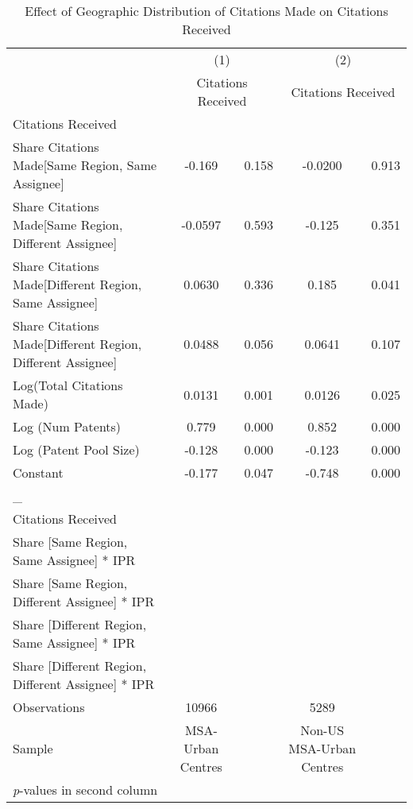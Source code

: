 {
\begin{longtable}{l*{2}{cc}}
\caption{Effect of Geographic Distribution of Citations Made on Citations Received \label{model12}}\\
\hline\hline\endfirsthead\hline\endhead\hline\endfoot\endlastfoot
                &\multicolumn{2}{c}{(1)}&\multicolumn{2}{c}{(2)}\\
                &\multicolumn{2}{c}{Citations Received}&\multicolumn{2}{c}{Citations Received}\\
\hline
Citations Received&         &         &         &         \\
Share Citations Made[Same Region, Same Assignee]&   -0.169&    0.158&  -0.0200&    0.913\\
Share Citations Made[Same Region, Different Assignee]&  -0.0597&    0.593&   -0.125&    0.351\\
Share Citations Made[Different Region, Same Assignee]&   0.0630&    0.336&    0.185&    0.041\\
Share Citations Made[Different Region, Different Assignee]&   0.0488&    0.056&   0.0641&    0.107\\
Log(Total Citations Made)&   0.0131&    0.001&   0.0126&    0.025\\
Log (Num Patents)&    0.779&    0.000&    0.852&    0.000\\
Log (Patent Pool Size)&   -0.128&    0.000&   -0.123&    0.000\\
Constant        &   -0.177&    0.047&   -0.748&    0.000\\
\hline
\_               &         &         &         &         \\
Citations Received&         &         &         &         \\
Share [Same Region, Same Assignee] * IPR&         &         &         &         \\
Share [Same Region, Different Assignee] * IPR&         &         &         &         \\
Share [Different Region, Same Assignee] * IPR&         &         &         &         \\
Share [Different Region, Different Assignee] * IPR&         &         &         &         \\
\hline
Observations    &    10966&         &     5289&         \\
Sample          &MSA-Urban Centres&         &Non-US MSA-Urban Centres&         \\
\hline\hline
\multicolumn{5}{l}{\footnotesize \textit{p}-values in second column}\\
\end{longtable}
}
